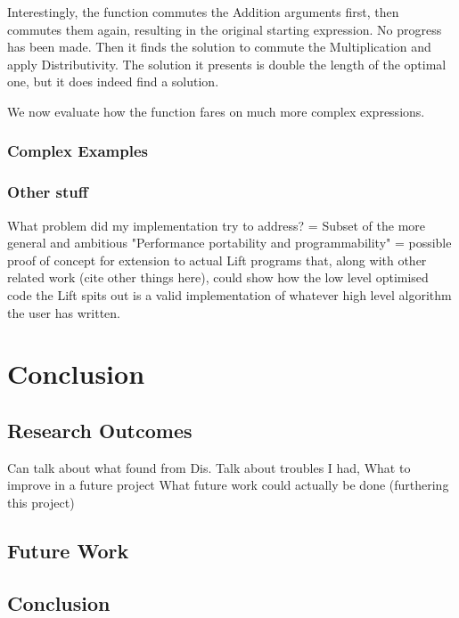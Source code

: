 \documentclass{l4proj}
\begin{document}
Interestingly, the function commutes the Addition arguments first, then commutes them again, resulting in the original starting expression. No progress has been made. Then it finds the solution to commute the Multiplication and apply Distributivity. The solution it presents is double the length of the optimal one, but it does indeed find a solution.


We now evaluate how the function fares on much more complex expressions.

\subsection{Complex Examples}


\subsection{Other stuff}
What problem did my implementation try to address? = Subset of the more general and ambitious "Performance portability and programmability" = possible proof of concept for extension to actual Lift programs that, along with other related work (cite other things here), could show how the low level optimised code the Lift spits out is a valid implementation of whatever high level algorithm the user has written.




\chapter{Conclusion}    


\section{Research Outcomes}
Can talk about what found from Dis.
Talk about troubles I had,
What to improve in a future project
What future work could actually be done (furthering this project)

\section{Future Work}
\section{Conclusion}
\end{document}
